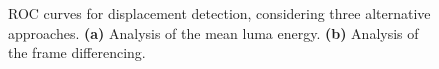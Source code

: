 \documentclass{llncs}
\newcommand{\gi}[1]{{\textcolor{red}{[\small \textbf{Giacomo}: #1]}}}
\begin{document}
%
%
%
%
\begin{figure}[htb]
\centering
{}
\caption{ROC curves for displacement detection, considering three alternative approaches. \textbf{(a)} Analysis of the mean luma energy. \textbf{(b)} Analysis of the frame differencing.}
\label{fig:ROCdisplacement}
\end{figure}
\end{document}
